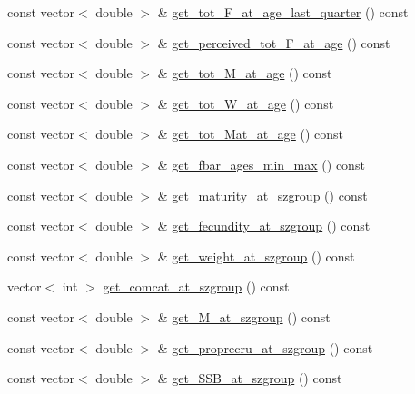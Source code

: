 \begin{DoxyCompactItemize}
\item 
const vector$<$ double $>$ \& \mbox{\hyperlink{class_population_a17c2aca418aa72a6bde1e17439a71067}{get\+\_\+tot\+\_\+\+F\+\_\+at\+\_\+age\+\_\+last\+\_\+quarter}} () const
\item 
const vector$<$ double $>$ \& \mbox{\hyperlink{class_population_a415f89aaf403711da3eda91f5aed1c21}{get\+\_\+perceived\+\_\+tot\+\_\+\+F\+\_\+at\+\_\+age}} () const
\item 
const vector$<$ double $>$ \& \mbox{\hyperlink{class_population_aaab9bd4e9065d855854360f3545d18fc}{get\+\_\+tot\+\_\+\+M\+\_\+at\+\_\+age}} () const
\item 
const vector$<$ double $>$ \& \mbox{\hyperlink{class_population_af7478d805116695ff97d0f5807a0fac3}{get\+\_\+tot\+\_\+\+W\+\_\+at\+\_\+age}} () const
\item 
const vector$<$ double $>$ \& \mbox{\hyperlink{class_population_a00ebf8857a53212013ca327623a7d729}{get\+\_\+tot\+\_\+\+Mat\+\_\+at\+\_\+age}} () const
\item 
const vector$<$ double $>$ \& \mbox{\hyperlink{class_population_a814f822599b32e19568a3e1f2b98bb94}{get\+\_\+fbar\+\_\+ages\+\_\+min\+\_\+max}} () const
\item 
const vector$<$ double $>$ \& \mbox{\hyperlink{class_population_aea95227073a7345f0b2237ad90b854e1}{get\+\_\+maturity\+\_\+at\+\_\+szgroup}} () const
\item 
const vector$<$ double $>$ \& \mbox{\hyperlink{class_population_aa6b1d67e670b56b7f303ee11a204ecc7}{get\+\_\+fecundity\+\_\+at\+\_\+szgroup}} () const
\item 
const vector$<$ double $>$ \& \mbox{\hyperlink{class_population_a4ac1d18b27bc6a29bc1bf9b39bd150dc}{get\+\_\+weight\+\_\+at\+\_\+szgroup}} () const
\item 
vector$<$ int $>$ \mbox{\hyperlink{class_population_ae14300183899b72220d777805c4f1865}{get\+\_\+comcat\+\_\+at\+\_\+szgroup}} () const
\item 
const vector$<$ double $>$ \& \mbox{\hyperlink{class_population_a5d99b48d185a8c0476853561b5b8743c}{get\+\_\+\+M\+\_\+at\+\_\+szgroup}} () const
\item 
const vector$<$ double $>$ \& \mbox{\hyperlink{class_population_a25243972da373b5d43507b5d532ced35}{get\+\_\+proprecru\+\_\+at\+\_\+szgroup}} () const
\item 
const vector$<$ double $>$ \& \mbox{\hyperlink{class_population_a539011e43cd2730b55bff9b6e9067460}{get\+\_\+\+S\+S\+B\+\_\+at\+\_\+szgroup}} () const
\item 

\end{DoxyCompactItemize}
